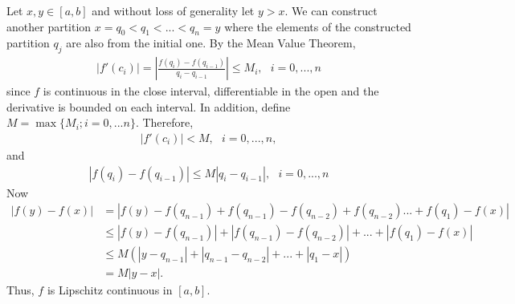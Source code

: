 \begin{questions}

\begin{solution}
Let $x,y\in[a,b]$ and without loss of generality let $y>x$. We can construct another partition $x=q_0<q_1<...<q_n=y$ where the elements of the constructed partition $q_j$ are also from the initial one. By the Mean Value Theorem, 
\begin{align*}
|f'(c_i)|=\left|\frac{f(q_i)-f(q_{i-1})}{q_i-q_{i-1}}\right|\leq M_i,~~~i=0,...,n
\end{align*}
since $f$ is continuous in the close interval, differentiable in the open and the derivative is bounded on each interval. In addition, define \newline $M=\max\{ M_i; i=0,...n \}$. Therefore,
\begin{align*}
|f'(c_i)|<M,~~~i=0,...,n,
\end{align*}
and
\begin{align*}
\left|f(q_i)-f(q_{i-1})\right|\leq M |q_i-q_{i-1}|,~~~i=0,...,n
\end{align*}
Now
\begin{align*}
\left|f(y)-f(x)\right|&=\left|f(y)-f(q_{n-1})+f(q_{n-1})-f(q_{n-2})+f(q_{n-2})...+f(q_{1})-f(x)\right|\\
&\leq \left|f(y)-f(q_{n-1})\right|+\left|f(q_{n-1})-f(q_{n-2})\right|+...+\left|f(q_{1})-f(x)\right|\\
&\leq M\left( \left|y-q_{n-1}\right|+\left|q_{n-1}-q_{n-2}\right|+...+\left|q_1-x\right|\right)\\
&= M |y-x|.
\end{align*}
Thus, $f$ is Lipschitz continuous in $[a,b]$.
\end{solution}
\end{questions}
